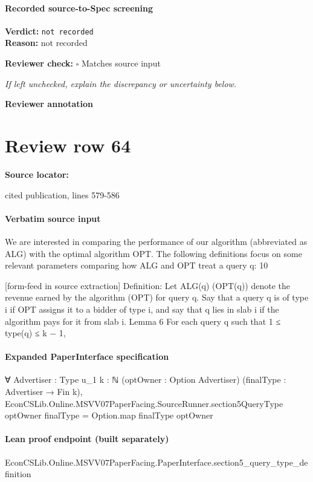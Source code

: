 \documentclass[10pt]{article}
\newcommand{\reviewerbox}{%
  \par\noindent\fbox{\parbox{0.96\linewidth}{\rule{0pt}{0.38in}}}\par
}
\newcommand{\reviewmatch}[1]{%
  \par\noindent\textbf{Reviewer check:} $\square$\; #1\par
  \noindent\emph{If left unchecked, explain the discrepancy or uncertainty below.}\par
}
\begin{document}
\paragraph{Recorded source-to-Spec screening}
\textbf{Verdict:} \texttt{not recorded}
\\
\textbf{Reason:} not recorded
\reviewmatch{Matches source input}
\noindent\textbf{Reviewer annotation}\par
\reviewerbox
\clearpage
\hypertarget{source-claim-0c55c9a988a86c66}{}
\section*{Review row 64}
\textbf{Source locator:} {\footnotesize\raggedright cited publication, lines 579-\allowbreak{}586\par}
\paragraph{Verbatim source input}
\begin{ReviewVerbatim}
We are interested in comparing the performance of our algorithm (abbreviated as ALG) with
the optimal algorithm OPT. The following definitions focus on some relevant parameters comparing how ALG and OPT treat a query q:
10


[form-feed in source extraction]
Definition: Let ALG(q) (OPT(q)) denote the revenue earned by the algorithm (OPT) for
query q. Say that a query q is of type i if OPT assigns it to a bidder of type i, and say that q
lies in slab i if the algorithm pays for it from slab i.
Lemma 6 For each query q such that 1 ≤ type(q) ≤ k − 1,
\end{ReviewVerbatim}


\paragraph{Expanded PaperInterface specification}
\begin{ReviewVerbatim}
∀ {Advertiser : Type u_1} {k : ℕ} (optOwner : Option Advertiser) (finalType : Advertiser → Fin k),
  EconCSLib.Online.MSVV07PaperFacing.SourceRunner.section5QueryType optOwner finalType = Option.map finalType optOwner
\end{ReviewVerbatim}

\paragraph{Lean proof endpoint (built separately)}\begin{ReviewVerbatim}
EconCSLib.Online.MSVV07PaperFacing.PaperInterface.section5_query_type_definition
\end{ReviewVerbatim}
\end{document}
